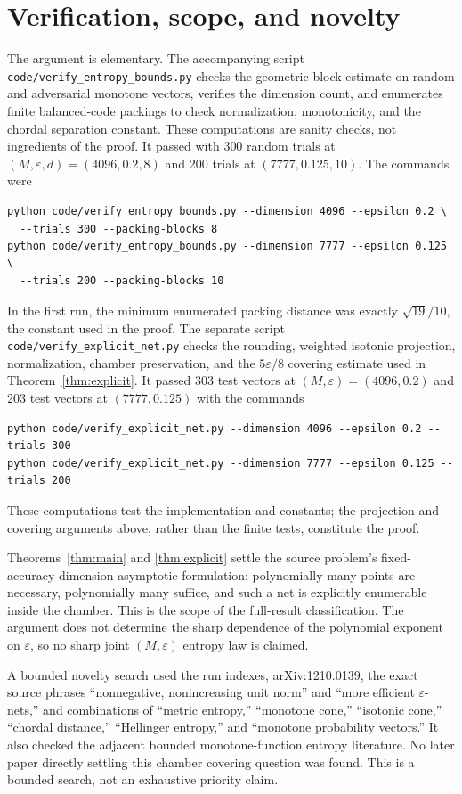 \documentclass[11pt]{article}
\begin{document}
\section{Verification, scope, and novelty}

The argument is elementary.  The accompanying script
\texttt{code/verify\_entropy\_bounds.py} checks the geometric-block estimate on
random and adversarial monotone vectors, verifies the dimension count, and
enumerates finite balanced-code packings to check normalization, monotonicity,
and the chordal separation constant.  These computations are sanity checks,
not ingredients of the proof.  It passed with 300 random trials at
$(M,\varepsilon,d)=(4096,0.2,8)$ and 200 trials at
$(7777,0.125,10)$.  The commands were
\begin{verbatim}
python code/verify_entropy_bounds.py --dimension 4096 --epsilon 0.2 \
  --trials 300 --packing-blocks 8
python code/verify_entropy_bounds.py --dimension 7777 --epsilon 0.125 \
  --trials 200 --packing-blocks 10
\end{verbatim}
In the first run, the minimum enumerated packing distance was exactly
$\sqrt{19}/10$, the constant used in the proof.  The separate script
\texttt{code/verify\_explicit\_net.py} checks the rounding, weighted isotonic
projection, normalization, chamber preservation, and the
$5\varepsilon/8$ covering estimate used in Theorem~\ref{thm:explicit}.  It
passed 303 test vectors at $(M,\varepsilon)=(4096,0.2)$ and 203 test vectors at
$(7777,0.125)$ with the commands
\begin{verbatim}
python code/verify_explicit_net.py --dimension 4096 --epsilon 0.2 --trials 300
python code/verify_explicit_net.py --dimension 7777 --epsilon 0.125 --trials 200
\end{verbatim}
These computations test the implementation and constants; the projection and
covering arguments above, rather than the finite tests, constitute the proof.

Theorems~\ref{thm:main} and \ref{thm:explicit} settle the source problem's
fixed-accuracy dimension-asymptotic formulation: polynomially many points are
necessary, polynomially many suffice, and such a net is explicitly enumerable
inside the chamber.  This is the scope of the full-result classification.  The
argument does not determine the sharp dependence of the polynomial exponent on
$\varepsilon$, so no sharp joint $(M,\varepsilon)$ entropy law is claimed.

A bounded novelty search used the run indexes, arXiv:1210.0139, the exact source
phrases ``nonnegative, nonincreasing unit norm'' and ``more efficient
$\varepsilon$-nets,'' and combinations of ``metric entropy,'' ``monotone
cone,'' ``isotonic cone,'' ``chordal distance,'' ``Hellinger entropy,'' and
``monotone probability vectors.''  It also checked the adjacent bounded
monotone-function entropy literature.  No later paper directly settling this
chamber covering question was found.  This is a bounded search, not an
exhaustive priority claim.
\end{document}
